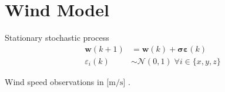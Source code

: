 \ETHslide
\section*{Wind Model}


\begin{minipage}{0.5\textwidth}
Stationary stochastic process
\begin{align}
\mathbf{w}(k+1) &= \mathbf{w}(k) + \boldsymbol{\sigma} \boldsymbol{\varepsilon}(k) \nonumber \\ 
{\varepsilon}_i (k) &\sim \mathcal{N}(0,1) \; \forall i \in \{ x,y,z \} \nonumber
\end{align}
\end{minipage}
\begin{minipage}{0.49\textwidth}
	\centering
	\tiny{
	
	
	\tiny{Wind speed observations in $[\si{\metre\per\second}$] \cite{www:googleheliostat}.} 
	}
\end{minipage}

\clearpage